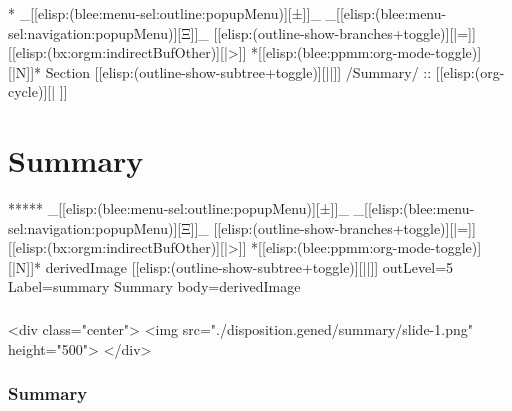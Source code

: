 \begin{whenOrg}




\begin{whenOrg}
*  _[[elisp:(blee:menu-sel:outline:popupMenu)][±]]_ _[[elisp:(blee:menu-sel:navigation:popupMenu)][Ξ]]_ [[elisp:(outline-show-branches+toggle)][|=]] [[elisp:(bx:orgm:indirectBufOther)][|>]] *[[elisp:(blee:ppmm:org-mode-toggle)][|N]]*  Section    [[elisp:(outline-show-subtree+toggle)][||]]   /Summary/ ::  [[elisp:(org-cycle)][| ]]
\end{whenOrg}

\section{Summary}

\begin{whenOrg}
*****  _[[elisp:(blee:menu-sel:outline:popupMenu)][±]]_ _[[elisp:(blee:menu-sel:navigation:popupMenu)][Ξ]]_ [[elisp:(outline-show-branches+toggle)][|=]] [[elisp:(bx:orgm:indirectBufOther)][|>]] *[[elisp:(blee:ppmm:org-mode-toggle)][|N]]*  derivedImage [[elisp:(outline-show-subtree+toggle)][||]] outLevel=5 Label=summary Summary body=derivedImage
\end{whenOrg}

\begin{htmlonly}

\begin{frame}[fragile,plain,label=summary]
    \frametitle{}
    \framesubtitle{}
    \begin{rawhtml}
<div class="center">
<img src="./disposition.gened/summary/slide-1.png" height="500">
</div>
    \end{rawhtml}
\end{frame}
\end{htmlonly}

\begin{verblatex}

\begin{frame}[fragile,plain,label=summary]
    \frametitle{Summary}
    \framesubtitle{}


\end{frame}
\end{verblatex}
\end{whenOrg}
